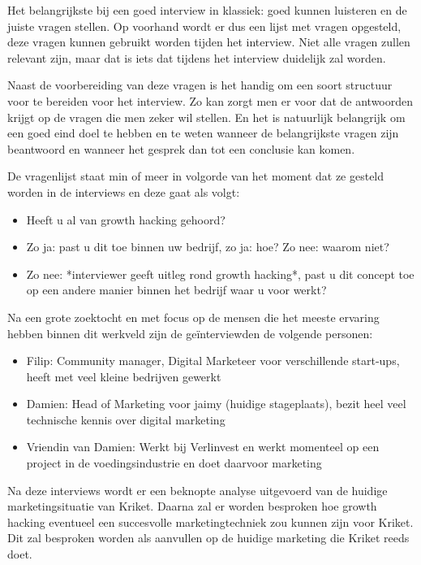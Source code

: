 Het belangrijkste bij een goed interview in klassiek: goed kunnen luisteren en de juiste vragen stellen. Op voorhand wordt er dus een lijst met vragen opgesteld, deze vragen kunnen gebruikt worden tijden het interview. Niet alle vragen zullen relevant zijn, maar dat is iets dat tijdens het interview duidelijk zal worden.

Naast de voorbereiding van deze vragen is het handig om een soort structuur voor te bereiden voor het interview. Zo kan zorgt men er voor dat de antwoorden krijgt op de vragen die men zeker wil stellen. En het is natuurlijk belangrijk om een goed eind doel te hebben en te weten wanneer de belangrijkste vragen zijn beantwoord en wanneer het gesprek dan tot een conclusie kan komen.

De vragenlijst staat min of meer in volgorde van het moment dat ze gesteld worden in de interviews en deze gaat als volgt:
\begin{itemize} 
	\item Heeft u al van growth hacking gehoord?
	\item Zo ja: past u dit toe binnen uw bedrijf, zo ja: hoe? Zo nee: waarom niet?
	\item Zo nee: *interviewer geeft uitleg rond growth hacking*, past u dit concept toe op een andere manier binnen het bedrijf waar u voor werkt?
\end{itemize}

Na een grote zoektocht en met focus op de mensen die het meeste ervaring hebben binnen dit werkveld zijn de geïnterviewden de volgende personen:
\begin{itemize} 
	\item Filip: Community manager, Digital Marketeer voor verschillende start-ups, heeft met veel kleine bedrijven gewerkt
	\item Damien: Head of Marketing voor jaimy (huidige stageplaats), bezit heel veel technische kennis over digital marketing
	\item Vriendin van Damien: Werkt bij Verlinvest en werkt momenteel op een project in de voedingsindustrie en doet daarvoor marketing
\end{itemize}

Na deze interviews wordt er een beknopte analyse uitgevoerd van de huidige marketingsituatie van Kriket. Daarna zal er worden besproken hoe growth hacking eventueel een succesvolle marketingtechniek zou kunnen zijn voor Kriket. Dit zal besproken worden als aanvullen op de huidige marketing die Kriket reeds doet.
